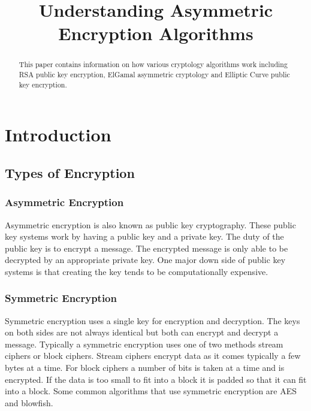 \documentclass[conference]{IEEEtran}
\begin{document}
	
\title{Understanding Asymmetric Encryption Algorithms}


\author{
\and
{}
}

\maketitle

\begin{abstract}
	This paper contains information on how various cryptology algorithms work including RSA public key encryption, ElGamal asymmetric cryptology and Elliptic Curve public key encryption. 
\end{abstract}

\IEEEpeerreviewmaketitle



\section{Introduction}

\subsection{Types of Encryption}


\subsubsection{Asymmetric Encryption}
Asymmetric encryption is also known as public key cryptography. These public key systems work by having a public key and a private key. The duty of the public key is to encrypt a message. The encrypted message is only able to be decrypted by an appropriate private key. One major down side of public key systems is that creating the key tends to be computationally expensive. 
\subsubsection{Symmetric Encryption}
Symmetric encryption uses a single key for encryption and decryption. The keys on both sides are not always identical but both can encrypt and decrypt a message. Typically a symmetric encryption uses one of two methods stream ciphers or block ciphers. Stream ciphers encrypt data as it comes typically a few bytes at a time. For block ciphers a number of bits is taken at a time and is encrypted. If the data is too small to fit into a block it is padded so that it can fit into a block. Some common algorithms that use symmetric encryption are AES and blowfish.
\end{document}

